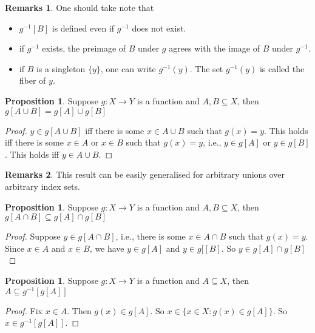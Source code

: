 \documentclass[14pt]{article}
\theoremstyle{definition}
\newtheorem*{remark}{Remarks}
\newtheorem{proposition}[definition]{Proposition}
\begin{document}
\begin{remark}
One should take note that
    \begin{itemize}
        \item  $g^{-1}[B] $ is defined even if $g^{-1}$ does not exist.
        \item  if $g^{-1}$ exists, the preimage of $B$ under $g$ agrees with the image of $B$ under $g^{-1}$.
        \item  if $B$ is a singleton $\{y\}$, one can write $g^{-1}(y)$. The set $g^{-1}(y)$ is called the fiber of $y$.
    \end{itemize}
\end{remark}

\vspace{3mm} %

\begin{proposition}
    Suppose $g\colon X\rightarrow Y$ is a function and $A,B\subseteq X$, then $g[A\cup B]=g[A]\cup g[B]$
\end{proposition}
\begin{proof}
    $y\in g[A\cup B]$ iff there is some $x\in A\cup B$ such  that $g(x)=y$. This holds iff there is some $x\in A$ or $x\in B$ such that $g(x)=y$, i.e.,  $y\in g[A] $ or $y\in g[B]$. This holds iff $y\in A\cup B$.
\end{proof}
\begin{remark}
    This result can be easily generalised for arbitrary unions over arbitrary index sets.
\end{remark}

\vspace{2mm} %

\begin{proposition}
    Suppose $g\colon X\rightarrow Y$ is a function and $A,B\subseteq X$, then $g[A\cap B]\subseteq g[A]\cap g[B]$
\end{proposition}
\begin{proof}
    Suppose $y\in g[A\cap B] $, i.e., there is some $x\in A\cap B$ such that $g(x)=y$. Since $x\in A$ and $x\in B$, we have $y\in g[A] $ and $y\in g[[B]$. So $y\in g[A]\cap g[B]$
\end{proof}

\vspace{2mm} %

\begin{proposition}
    Suppose $g\colon X\rightarrow Y$ is a function and $A\subseteq X$, then $A\subseteq g^{-1}[g[A]]$
\end{proposition}
\begin{proof}
    Fix $x\in A$. Then $g(x)\in g[A]$. So $x\in\{x\in X\colon g(x)\in g[A]\}$. So $x\in g^{-1}[g[A]]$.
\end{proof}
\newpage
\end{document}
